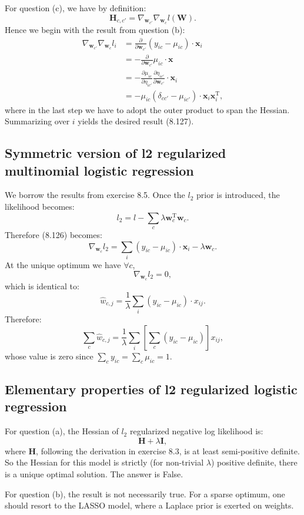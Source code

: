 \documentclass[UTF8]{ctexart}
\begin{document}
For question (c), we have by definition:
$$\textbf{H}_{c,c'}=\nabla_{\textbf{w}_{c'}}\nabla_{\textbf{w}_{c}}l(\textbf{W}).$$
Hence we begin with the result from question (b):
$$
\begin{aligned}
\nabla_{\textbf{w}_{c'}}\nabla_{\textbf{w}_{c}}l_{i}&=\frac{\partial}{\partial \textbf{w}_{c'}}(y_{ic}-\mu_{ic})\cdot\textbf{x}_{i}\\
&=-\frac{\partial }{\partial \textbf{w}_{c'}}\mu_{ic}\cdot\textbf{x}\\
&=-\frac{\partial\mu_{ic}}{\partial \eta_{ic'}}\frac{\partial \eta_{ic'}}{\partial \textbf{w}_{c'}}\cdot\textbf{x}_{i}\\
&=-\mu_{ic}(\delta_{cc'}-\mu_{ic'})\cdot\textbf{x}_{i}\textbf{x}_{i}^{\text{T}},
\end{aligned}
$$
where in the last step we have to adopt the outer product to span the Hessian.
Summarizing over $i$ yields the desired result (8.127).

\subsection{Symmetric version of l2 regularized multinomial logistic regression}
We borrow the results from exercise 8.5.
Once the $l_{2}$ prior is introduced, the likelihood becomes:
$$l_{2}=l-\sum_{c}\lambda\textbf{w}_{c}^{\text{T}}\textbf{w}_{c}.$$
Therefore (8.126) becomes:
$$\nabla_{\textbf{w}_{c}}l_{2}=\sum_{i}(y_{ic}-\mu_{ic})\cdot\textbf{x}_{i}-\lambda\textbf{w}_{c}.$$
At the unique optimum we have $\forall c$,
$$\nabla_{\textbf{w}_{c}}l_{2}=0,$$
which is identical to:
$$\hat{w}_{c,j}=\frac{1}{\lambda}\sum_{i}(y_{ic}-\mu_{ic})\cdot x_{ij}.$$
Therefore:
$$\sum_{c}\hat{w}_{c,j}=\frac{1}{\lambda}\sum_{i}\left[\sum_{c}(y_{ic}-\mu_{ic})\right]x_{ij},$$
whose value is zero since $\sum_{c}y_{ic}=\sum_{c}\mu_{ic}=1$.

\subsection{Elementary properties of l2 regularized logistic regression}
For question (a), the Hessian of $l_{2}$ regularized negative log likelihood is:
$$\textbf{H}+\lambda \textbf{I},$$
where $\textbf{H}$, following the derivation in exercise 8.3, is at least semi-positive definite.
So the Hessian for this model is strictly (for non-trivial $\lambda$) positive definite, there is a unique optimal solution.
The answer is False.

For question (b), the result is not necessarily true.
For a sparse optimum, one should resort to the LASSO model, where a Laplace prior is exerted on weights.
\end{document}
